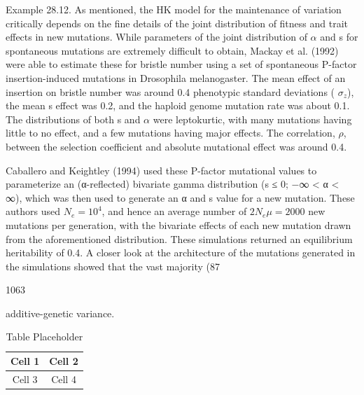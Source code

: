 \documentclass{article}
\begin{document}
Example 28.12. As mentioned, the HK model for the maintenance of variation critically depends on the fine details of the joint distribution of fitness and trait effects in new mutations. While parameters of the joint distribution of  $ \alpha $ and s for spontaneous mutations are extremely difficult to obtain, Mackay et al. (1992) were able to estimate these for bristle number using a set of spontaneous P-factor insertion-induced mutations in Drosophila melanogaster. The mean effect of an insertion on bristle number was around 0.4 phenotypic standard deviations ( $ \sigma_{z} $), the mean s effect was 0.2, and the haploid genome mutation rate was about 0.1. The distributions of both s and  $ \alpha $ were leptokurtic, with many mutations having little to no effect, and a few mutations having major effects. The correlation,  $ \rho $, between the selection coefficient and absolute mutational effect was around 0.4.

Caballero and Keightley (1994) used these P-factor mutational values to parameterize an (α-reflected) bivariate gamma distribution (s ≤ 0; −∞ < α < ∞), which was then used to generate an α and s value for a new mutation. These authors used  $ N_e = 10^4 $, and hence an average number of  $ 2N_e\mu = 2000 $ new mutations per generation, with the bivariate effects of each new mutation drawn from the aforementioned distribution. These simulations returned an equilibrium heritability of 0.4. A closer look at the architecture of the mutations generated in the simulations showed that the vast majority (87%

1063

additive-genetic variance.

\begin{table}[h]
\centering
\begin{tabular}{|c|c|}
\hline
Cell 1 & Cell 2 \\
\hline
Cell 3 & Cell 4 \\
\hline
\end{tabular}
\caption{Table Placeholder}
\end{table}
\end{document}
